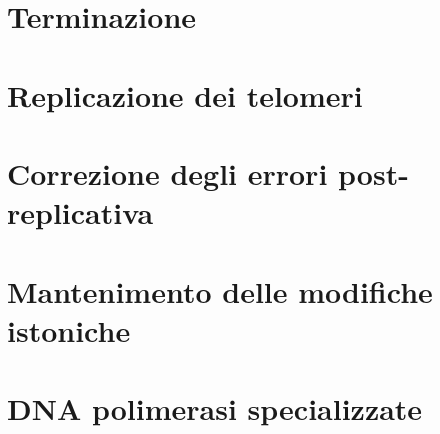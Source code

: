 \section{Terminazione}

\section{Replicazione dei telomeri}

\section{Correzione degli errori post-replicativa}

\section{Mantenimento delle modifiche istoniche}

\section{DNA polimerasi specializzate}

